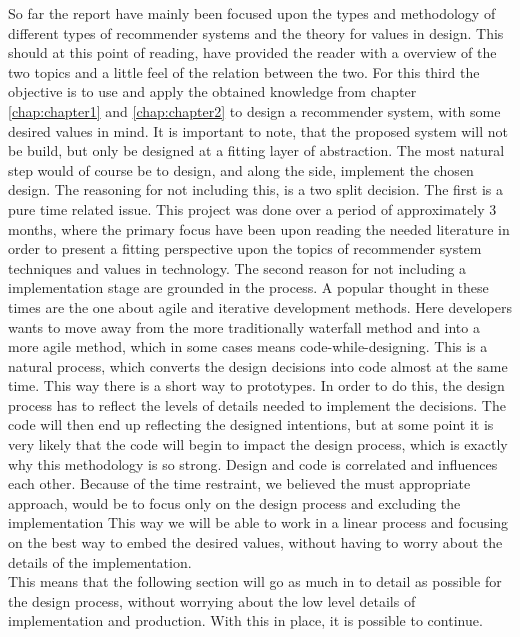 So far the report have mainly been focused upon the types and methodology of different types of recommender systems and the theory for values in design. This should at this point of reading, have provided the reader with a overview of the two topics and a little feel of the relation between the two. For this third the objective is to use and apply the obtained knowledge from chapter \ref{chap:chapter1} and \ref{chap:chapter2} to design a recommender system, with some desired values in mind. It is important to note, that the proposed system will not be build, but only be designed at a fitting layer of abstraction. The most natural step would of course be to design, and along the side, implement the chosen design. The reasoning for not including this, is a two split decision. The first is a pure time related issue. This project was done over a period of approximately 3 months, where the primary focus have been upon reading the needed literature in order to present a fitting perspective upon the topics of recommender system techniques and values in technology. The second reason for not including a implementation stage are grounded in the process. A popular thought in these times are the one about agile and iterative development methods. Here developers wants to move away from the more traditionally waterfall method and into a more agile method, which in some cases means code-while-designing. This is a natural process, which converts the design decisions into code almost at the same time. This way there is a short way to prototypes. In order to do this, the design process has to reflect the levels of details needed to implement the decisions. The code will then end up reflecting the designed intentions, but at some point it is very likely that the code will begin to impact the design process, which is exactly why this methodology is so strong. Design and code is correlated and influences each other. Because of the time restraint, we believed the must appropriate approach, would be to focus only on the design process and excluding the implementation This way we will be able to work in a linear process and focusing on the best way to embed the desired values, without having to worry about the details of the implementation.\\
This means that the following section will go as much in to detail as possible for the design process, without worrying about the low level details of implementation and production. With this in place, it is possible to continue. 


